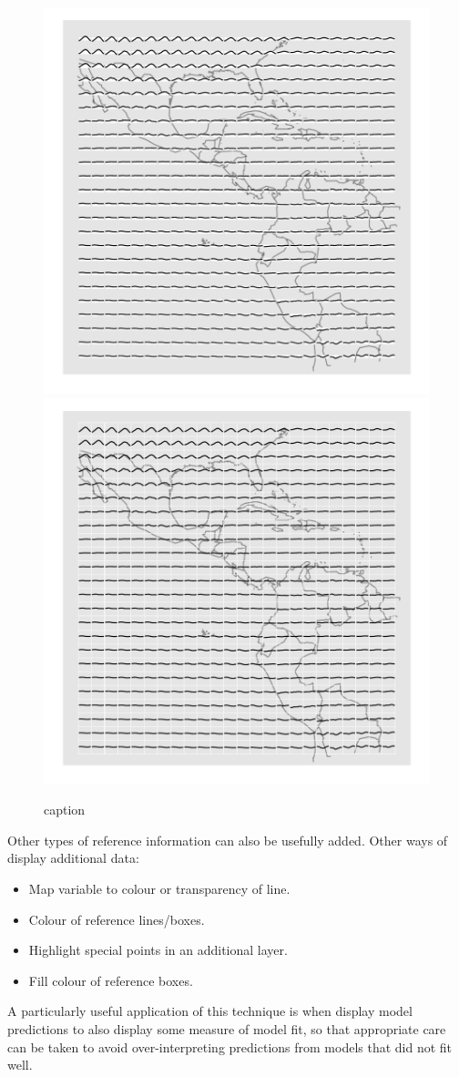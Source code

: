 \documentclass[oneside]{article}
\begin{document}
\begin{figure}[htbp]
  \centering
  \includegraphics[width=0.5\linewidth]{ref-line}%
  \includegraphics[width=0.5\linewidth]{ref-box}
  \caption{caption}
  \label{fig:ref-basic}
\end{figure}

Other types of reference information can also be usefully added. 
Other ways of display additional data:

\begin{itemize}

  \item Map variable to colour or transparency of line. 
  
  \item Colour of reference lines/boxes.
  
  \item Highlight special points in an additional layer.

  \item Fill colour of reference boxes. 
  
\end{itemize}

A particularly useful application of this technique is when display model predictions to also display some measure of model fit, so that appropriate care can be taken to avoid over-interpreting predictions from models that did not fit well.
\end{document}
